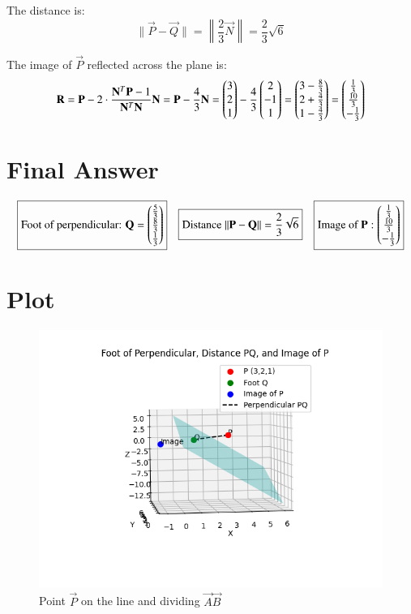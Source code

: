 \documentclass[journal]{IEEEtran}
\begin{document}
The distance is:
\[
\|\vec{P} - \vec{Q}\| = \left\| \frac{2}{3} \vec{N} \right\| = \frac{2}{3} \sqrt{6}
\]

The image of \( \vec{P} \) reflected across the plane is:
\[
\mathbf{R} = \mathbf{P} - 2 \cdot \frac{\mathbf{N}^T \mathbf{P} - 1}{\mathbf{N}^T \mathbf{N}} \mathbf{N}
= \mathbf{P} - \frac{4}{3} \mathbf{N}
= \begin{pmatrix}3 \\ 2 \\ 1\end{pmatrix} - \frac{4}{3} \begin{pmatrix}2 \\ -1 \\ 1\end{pmatrix}
= \begin{pmatrix}3 - \frac{8}{3} \\ 2 + \frac{4}{3} \\ 1 - \frac{4}{3}\end{pmatrix}
= \begin{pmatrix}\frac{1}{3} \\ \frac{10}{3} \\ -\frac{1}{3}\end{pmatrix}
\]

\section*{\large\textbf{Final Answer}}

\[
\boxed{
\text{Foot of perpendicular: } \mathbf{Q} = \begin{pmatrix}\frac{5}{3} \\ \frac{8}{3} \\ \frac{1}{3}\end{pmatrix}
}
\quad
\boxed{
\text{Distance } \|\mathbf{P} - \mathbf{Q}\| = \frac{2}{3} \sqrt{6}
}
\quad
\boxed{
\text{Image of } \mathbf{P}: \begin{pmatrix}\frac{1}{3} \\ \frac{10}{3} \\ -\frac{1}{3}\end{pmatrix}
}
\]






\section*{\large\textbf{Plot}}
\begin{figure}[H]
\centering
\includegraphics[width=1.1\linewidth]{Figs/Fig_1.png}
\caption{Point \( \vec{P} \) on the line and dividing \( \vec{A}\vec{B} \)}
\end{figure}
\end{document}
